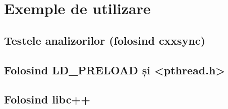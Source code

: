 \section{Exemple de utilizare}
\subsection{Testele analizorilor (folosind cxxsync)}
\subsection{Folosind LD\_PRELOAD și <pthread.h>}
\subsection{Folosind libc++}
